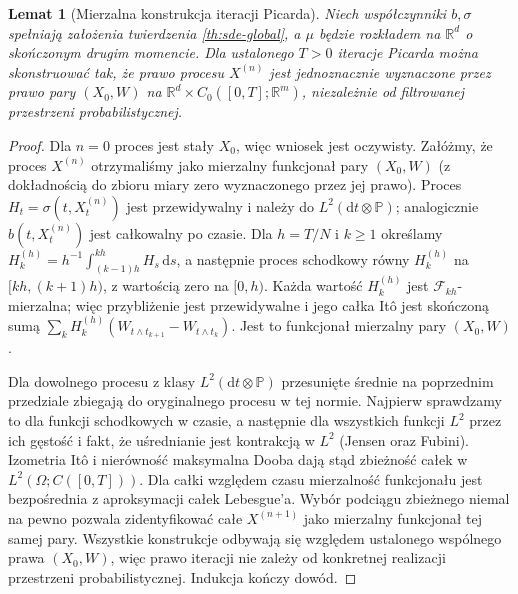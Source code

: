 \documentclass[11pt,a4paper,oneside]{report}
\numberwithin{equation}{chapter}
\theoremstyle{plain}
\newtheorem{lemat}[twierdzenie]{Lemat}
\theoremstyle{definition}
\theoremstyle{remark}
\newcommand{\R}{\mathbb{R}}
\newcommand{\Prob}{\mathbb{P}}
\newcommand{\calF}{\mathcal{F}}
\newcommand{\dd}{\mathrm{d}}
\begin{document}
\begin{lemat}[Mierzalna konstrukcja iteracji Picarda]\label{lem:volIII:05:02}
\label{lem:picard-measurable}
Niech współczynniki $b,\sigma$ spełniają założenia
twierdzenia \ref{th:sde-global}, a $\mu$ będzie rozkładem
na $\R^d$ o skończonym drugim momencie.
Dla ustalonego $T>0$ iteracje Picarda można skonstruować
tak, że prawo procesu $X^{(n)}$ jest jednoznacznie
wyznaczone przez prawo pary $(X_0,W)$ na
$\R^d\times C_0([0,T];\R^m)$, niezależnie od
filtrowanej przestrzeni probabilistycznej.
\end{lemat}
\begin{proof}
Dla $n=0$ proces jest stały $X_0$, więc wniosek jest oczywisty.
Załóżmy, że proces $X^{(n)}$ otrzymaliśmy jako mierzalny
funkcjonał pary $(X_0,W)$ (z dokładnością do zbioru miary
zero wyznaczonego przez jej prawo). Proces
$H_t=\sigma(t,X_t^{(n)})$ jest przewidywalny i należy
do $L^2(\dd t\otimes\Prob)$; analogicznie
$b(t,X_t^{(n)})$ jest całkowalny po czasie.
Dla $h=T/N$ i $k\ge1$ określamy
$H_k^{(h)}=h^{-1}\int_{(k-1)h}^{kh}H_s\,\dd s$,
a następnie proces schodkowy równy $H_k^{(h)}$
na $[kh,(k+1)h)$, z wartością zero na $[0,h)$.
Każda wartość $H_k^{(h)}$ jest $\calF_{kh}$-mierzalna;
więc przybliżenie jest przewidywalne i jego całka
Itô jest skończoną sumą
$\sum_k H_k^{(h)}(W_{t\wedge t_{k+1}}-W_{t\wedge t_k})$.
Jest to funkcjonał mierzalny pary $(X_0,W)$.

Dla dowolnego procesu z klasy $L^2(\dd t\otimes\Prob)$
przesunięte średnie na poprzednim przedziale zbiegają
do oryginalnego procesu w tej normie. Najpierw sprawdzamy
to dla funkcji schodkowych w czasie, a następnie dla
wszystkich funkcji $L^2$ przez ich gęstość i fakt, że
uśrednianie jest kontrakcją w $L^2$ (Jensen oraz Fubini).
Izometria Itô i nierówność maksymalna Dooba dają stąd
zbieżność całek w $L^2(\Omega;C([0,T]))$.
Dla całki względem czasu mierzalność funkcjonału
jest bezpośrednia z aproksymacji całek Lebesgue'a.
Wybór podciągu zbieżnego niemal na pewno pozwala
zidentyfikować całe $X^{(n+1)}$ jako mierzalny
funkcjonał tej samej pary. Wszystkie konstrukcje
odbywają się względem ustalonego wspólnego prawa
$(X_0,W)$, więc prawo iteracji nie zależy od
konkretnej realizacji przestrzeni probabilistycznej.
Indukcja kończy dowód.
\end{proof}
\end{document}
